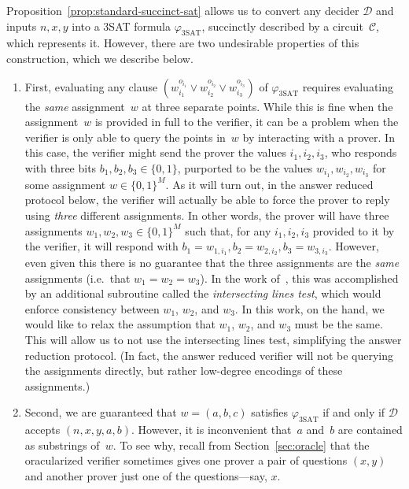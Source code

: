 \documentclass[11pt]{article}
\theoremstyle{definition}
\newcommand{\decider}{\mathcal{D}}
\newcommand{\circuit}{\mathcal{C}}
\begin{document}
Proposition~\ref{prop:standard-succinct-sat} allows us to convert any decider
$\decider$ and inputs $n, x, y$ into a 3SAT formula $\varphi_{\mathrm{3SAT}}$,
succinctly described by a circuit~$\circuit$, which represents it.
However, there are two undesirable properties of this construction, which we
describe below.
\begin{enumerate}
\item First, evaluating any clause $(w_{i_1}^{o_{i_1}} \lor
  w_{i_2}^{o_{i_2}}\lor w_{i_3}^{o_{i_3}})$ of $\varphi_{\mathrm{3SAT}}$
  requires evaluating the \emph{same} assignment~$w$ at three separate points.
	While this is fine when the assignment~$w$ is provided in full to the
  verifier, it can be a problem when the verifier is only able to query the
  points in~$w$ by interacting with a prover.
	In this case, the verifier might send the prover the values $i_1, i_2, i_3$,
  who responds with three bits $b_1, b_2, b_3 \in \{0, 1\}$, purported to be the
  values $w_{i_1}, w_{i_2}, w_{i_3}$ for some assignment $w \in \{0, 1\}^M$.
	As it will turn out, in the answer reduced protocol below, the verifier will
  actually be able to force the prover to reply using \emph{three} different
  assignments.
	In other words, the prover will have three assignments $w_1, w_2, w_3 \in \{0,
  1\}^M$ such that, for any $i_1, i_2, i_3$ provided to it by the verifier, it
  will respond with $b_1 = w_{1, i_1}, b_2 = w_{2, i_2}, b_3 = w_{3, i_3}$.
	However, even given this there is no guarantee that the three assignments are
  the \emph{same} assignments (i.e.\ that $w_1 = w_2 = w_3$).
	In the work of~\cite{NW19}, this was accomplished by an additional subroutine
  called the \emph{intersecting lines test}, which would enforce consistency
  between $w_1$, $w_2$, and $w_3$.
	In this work, on the hand, we would like to relax the assumption that $w_1$,
  $w_2$, and $w_3$ must be the same.
	This will allow us to not use the intersecting lines test, simplifying the
  answer reduction protocol.
	(In fact, the answer reduced verifier will not be querying the assignments
  directly, but rather low-degree encodings of these assignments.)
\item Second, we are guaranteed that $w = (a, b, c)$ satisfies
  $\varphi_{\mathrm{3SAT}}$ if and only if $\decider$ accepts $(n, x, y, a, b)$.
	However, it is inconvenient that~$a$ and~$b$ are contained as substrings
  of~$w$.
	To see why, recall from Section~\ref{sec:oracle} that the oracularized
  verifier sometimes gives one prover a pair of questions $(x, y)$ and another
  prover just one of the questions---say, $x$.

\end{enumerate}
\end{document}
